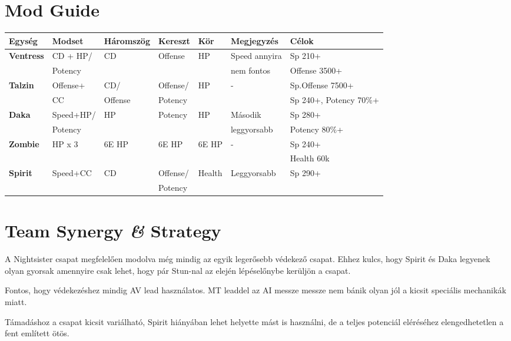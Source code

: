 \documentclass[11pt]{report}
\begin{document}
\section{Mod Guide}
\begin{center}
    \begin{tabular}{|l | l | l | l | l | l | l |}
        \hline
        Egység & Modset & Háromszög & Kereszt & Kör & Megjegyzés & Célok\\ \hline
        \textbf{Ventress} & CD + HP/ & CD & Offense & HP & Speed annyira & Sp 210+\\
        & Potency &  &  &  &  nem fontos & Offense 3500+\\ \hline
        \textbf{Talzin} & Offense+ & CD/ & Offense/ & HP & - & Sp.Offense 7500+\\
        & CC & Offense & Potency &  &  & Sp 240+, Potency 70\%+\\ \hline
        \textbf{Daka} & Speed+HP/ & HP & Potency & HP & Második & Sp 280+\\
        & Potency &  &  &  & leggyorsabb & Potency 80\%+\\ \hline
        \textbf{Zombie} & HP x 3 & 6E HP & 6E HP & 6E HP & - & Sp 240+\\
        &  &  &  &  &  & Health 60k\\ \hline
        \textbf{Spirit} & Speed+CC & CD & Offense/ & Health & Leggyorsabb & Sp 290+\\
        &  &  & Potency &  &  & \\ \hline
    \end{tabular}
\end{center}
\section{Team Synergy \textit{\&} Strategy}
A Nightsister csapat megfelelően modolva még mindig az egyik legerősebb védekező csapat. Ehhez kulcs, hogy Spirit és Daka legyenek olyan gyorsak amennyire csak lehet, hogy pár Stun-nal az elején lépéselőnybe kerüljön a csapat.\par
Fontos, hogy védekezéshez mindig AV lead használatos. MT leaddel az AI messze messze nem bánik olyan jól a kicsit speciális mechanikák miatt.\par
Támadáshoz a csapat kicsit variálható, Spirit hiányában lehet helyette mást is használni, de a teljes potenciál eléréséhez elengedhetetlen a fent említett ötös.

\end{document}
